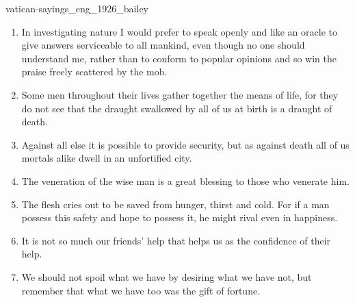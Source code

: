 \documentclass{stex}
\begin{document}
\begin{smodule}{vatican-sayings_eng_1926_bailey}
\begin{sparagraph}[id=vatican-sayings,name={Vatican Sayings}]
\begin{enumerate}[listparindent=0cm]
    \item\begin{sparagraph}[id=saying:29,name=Vatican Saying 29]
      In investigating nature I would prefer to speak openly and like an oracle to give answers serviceable to all mankind, even though no one should understand me, rather than to conform to popular opinions and so win the praise freely scattered by the mob.
    \end{sparagraph}

    \item\begin{sparagraph}[id=saying:30,name=Vatican Saying 30]
      Some men throughout their lives gather together the means of life, for they do not see that the draught swallowed by all of us at birth is a draught of death.
    \end{sparagraph}

    \item\begin{sparagraph}[id=saying:31,name=Vatican Saying 31]
      Against all else it is possible to provide security, but as against death all of us mortals alike dwell in an unfortified city.
    \end{sparagraph}

    \item\begin{sparagraph}[id=saying:32,name=Vatican Saying 32]
      The veneration of the wise man is a great blessing to those who venerate him.
    \end{sparagraph}

    \item\begin{sparagraph}[id=saying:33,name=Vatican Saying 33]
      The flesh cries out to be saved from hunger, thirst and cold.
      For if a man possess this safety and hope to possess it, he might rival even  in happiness.
    \end{sparagraph}

    \item\begin{sparagraph}[id=saying:34,name=Vatican Saying 34]
      It is not so much our friends’ help that helps us as the confidence of their help.
    \end{sparagraph}

    \item\begin{sparagraph}[id=saying:35,name=Vatican Saying 35]
      We should not spoil what we have by desiring what we have not, but remember that what we have too was the gift of fortune.
    \end{sparagraph}


\end{enumerate}
\end{sparagraph}
\end{smodule}
\end{document}
